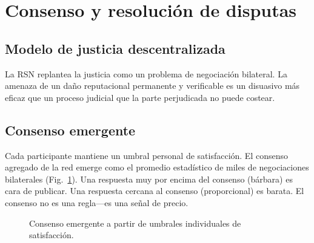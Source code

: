 \documentclass[11pt,a4paper,twocolumn]{article}
\begin{document}
\section{Consenso y resolución de disputas}

\subsection{Modelo de justicia descentralizada}

La RSN replantea la justicia como un problema de negociación bilateral. La amenaza de un daño reputacional permanente y verificable es un disuasivo más eficaz que un proceso judicial que la parte perjudicada no puede costear.

\subsection{Consenso emergente}

Cada participante mantiene un umbral personal de satisfacción. El consenso agregado de la red emerge como el promedio estadístico de miles de negociaciones bilaterales (Fig.~\ref{fig:consensus}). Una respuesta muy por encima del consenso (bárbara) es cara de publicar. Una respuesta cercana al consenso (proporcional) es barata. El consenso no es una regla---es una señal de precio.

\begin{figure}[ht]
\centering
{}
\caption{Consenso emergente a partir de umbrales individuales de satisfacción.}
\label{fig:consensus}
\end{figure}
\end{document}
